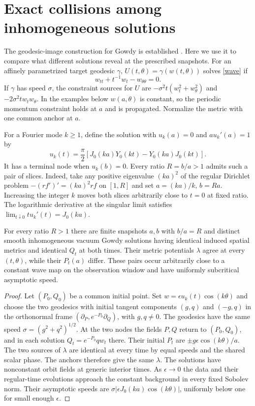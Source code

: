 \section{Exact collisions among inhomogeneous solutions}
\label{sec:exact-inhomogeneous}

The geodesic-image construction for Gowdy is established
\cite[\S\S III--IV]{berger}. Here we use it to compare what different
solutions reveal at the prescribed snapshots.
For an affinely parametrized target geodesic $\gamma$,
$U(t,\theta)=\gamma(w(t,\theta))$ solves \eqref{wave} if
\[
 w_{tt}+t^{-1}w_t-w_{\theta\theta}=0.
\]
If $\gamma$ has speed $\sigma$, the constraint sources for
$U$ are $-\sigma^2 t(w_t^2+w_\theta^2)$ and
$-2\sigma^2t w_t w_\theta$. In the examples below $w(a,\theta)$
is constant, so the periodic momentum constraint holds at $a$
and is propagated. Normalize the metric with one common
anchor at $a$.

For a Fourier mode $k\ge1$, define the solution with
$u_k(a)=0$ and $a u_k'(a)=1$ by
\begin{equation}
 u_k(t)=\frac{\pi}{2}
   [J_0(ka)Y_0(kt)-Y_0(ka)J_0(kt)].
 \label{eq:invisible}
\end{equation}
It has a terminal node when $u_k(b)=0$.
Every ratio $R=b/a>1$ admits such a pair of slices.
Indeed, take any positive eigenvalue $(ka)^2$ of the regular
Dirichlet problem $-(r f')'=(ka)^2 r f$ on $[1,R]$ and set
$a=(ka)/k$, $b=Ra$. Increasing the integer $k$ moves both slices
arbitrarily close to $t=0$ at fixed ratio.
The logarithmic derivative at the singular limit satisfies
$\lim_{t\downarrow0}t u_k'(t)=J_0(ka)$.

\begin{theorem}
\label{th:exact-inhomogeneous}
For every ratio $R>1$ there are finite snapshots $a,b$ with
$b/a=R$ and distinct smooth inhomogeneous vacuum Gowdy solutions
having identical induced spatial metrics and identical $Q_t$ at
both times. Their metric potentials $\lambda$ agree at every
$(t,\theta)$, while their $P_t(a)$ differ. These pairs occur
arbitrarily close to a constant wave map on the observation
window and have uniformly subcritical asymptotic speed.
\end{theorem}

\begin{proof}
Let $(P_0,Q_0)$ be a common initial point. Set
$w=\epsilon u_k(t)\cos(k\theta)$ and choose the two geodesics
with initial tangent components $(g,q)$ and $(-g,q)$ in the
orthonormal frame $(\partial_P,e^{-P_0}\partial_Q)$, with
$g,q\ne0$. The geodesics have the same speed
$\sigma=(g^2+q^2)^{1/2}$. At the two nodes the fields $P,Q$
return to $(P_0,Q_0)$, and in each solution
$Q_t=e^{-P_0}q w_t$ there. Their initial $P_t$ are
$\pm g\epsilon\cos(k\theta)/a$. The two sources of $\lambda$
are identical at every time by equal speeds and the shared
scalar phase. The anchors therefore give the same $\lambda$.
The solutions have nonconstant orbit fields at generic interior
times. As $\epsilon\to 0$ the data and their regular-time
evolutions approach the constant background in every fixed
Sobolev norm. Their asymptotic speeds are
$\sigma|\epsilon J_0(ka)\cos(k\theta)|$, uniformly below one
for small enough $\epsilon$.
\end{proof}

